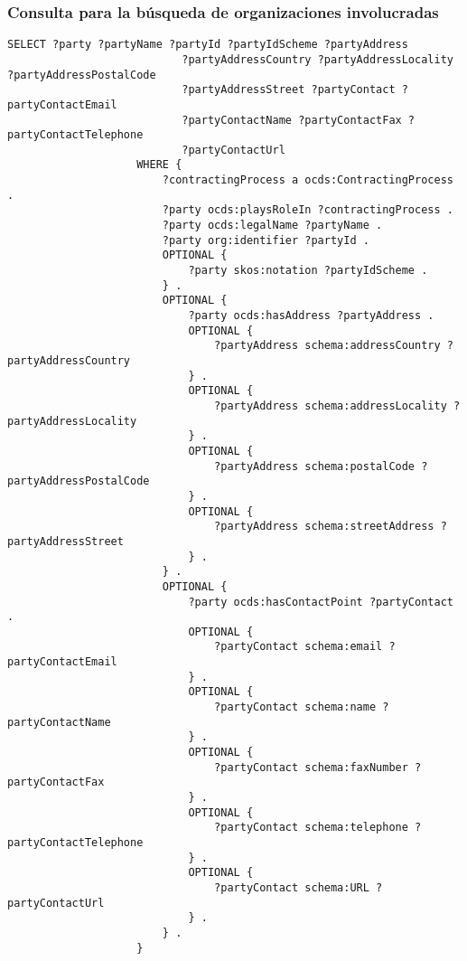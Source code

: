         \subsubsection{Consulta para la búsqueda de organizaciones involucradas}
            \begin{minipage}{\linewidth}
                \begin{lstlisting}[language=lSPARQL]
                    SELECT ?party ?partyName ?partyId ?partyIdScheme ?partyAddress
                           ?partyAddressCountry ?partyAddressLocality ?partyAddressPostalCode 
                           ?partyAddressStreet ?partyContact ?partyContactEmail
                           ?partyContactName ?partyContactFax ?partyContactTelephone 
                           ?partyContactUrl
                    WHERE {
                        ?contractingProcess a ocds:ContractingProcess .
                        ?party ocds:playsRoleIn ?contractingProcess .
                        ?party ocds:legalName ?partyName .
                        ?party org:identifier ?partyId .
                        OPTIONAL {
                            ?party skos:notation ?partyIdScheme .
                        } .
                        OPTIONAL {
                            ?party ocds:hasAddress ?partyAddress .
                            OPTIONAL {
                                ?partyAddress schema:addressCountry ?partyAddressCountry
                            } .
                            OPTIONAL {
                                ?partyAddress schema:addressLocality ?partyAddressLocality
                            } .
                            OPTIONAL {
                                ?partyAddress schema:postalCode ?partyAddressPostalCode
                            } .
                            OPTIONAL {
                                ?partyAddress schema:streetAddress ?partyAddressStreet
                            } .
                        } .
                        OPTIONAL {
                            ?party ocds:hasContactPoint ?partyContact .
                            OPTIONAL {
                                ?partyContact schema:email ?partyContactEmail
                            } .
                            OPTIONAL {
                                ?partyContact schema:name ?partyContactName
                            } .
                            OPTIONAL {
                                ?partyContact schema:faxNumber ?partyContactFax
                            } .
                            OPTIONAL {
                                ?partyContact schema:telephone ?partyContactTelephone
                            } .
                            OPTIONAL {
                                ?partyContact schema:URL ?partyContactUrl
                            } .
                        } .
                    }
                \end{lstlisting}
            \end{minipage}
            
